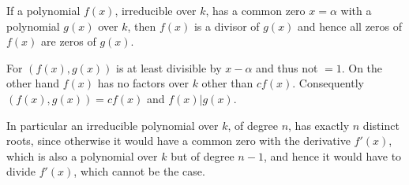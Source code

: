 If a polynomial $f(x)$, irreducible over $k$, has a common zero $x = \alpha$ with a polynomial $g(x)$ over $k$, then $f(x)$ is a divisor of $g(x)$ and hence all zeros of $f(x)$ are zeros of $g(x)$.

For $(f(x), g(x))$ is at least divisible by $x - \alpha$ and thus not $= 1$. On the other hand $f(x)$ has no factors over $k$ other than $cf(x)$. Consequently $(f(x), g(x)) = cf(x)$ and $f(x)|g(x)$.

In particular an irreducible polynomial over $k$, of degree $n$, has exactly $n$ distinct roots, since otherwise it would have a common zero with the derivative $f'(x)$, which is also a polynomial over $k$ but of degree $n - 1$, and hence it would have to divide $f'(x)$, which cannot be the case.
